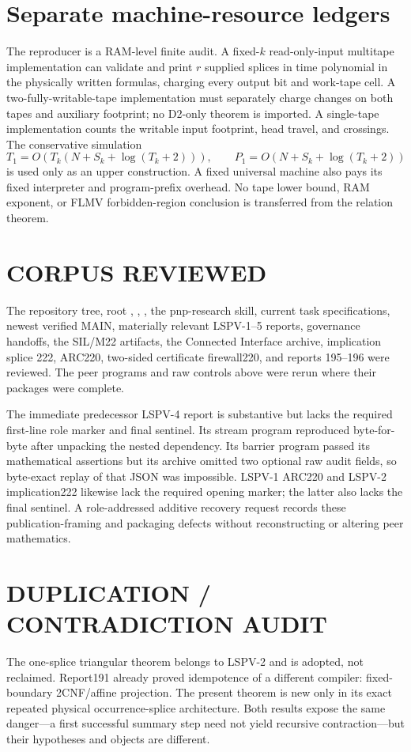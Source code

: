 \documentclass[11pt]{article}
\begin{document}
\section{Separate machine-resource ledgers}
The reproducer is a RAM-level finite audit. A fixed-$k$ read-only-input
multitape implementation can validate and print $r$ supplied splices in time
polynomial in the physically written formulas, charging every output bit and
work-tape cell. A two-fully-writable-tape implementation must separately
charge changes on both tapes and auxiliary footprint; no D2-only theorem is
imported. A single-tape implementation counts the writable input footprint,
head travel, and crossings. The conservative simulation
\[
T_1=O\!\left(T_k(N+S_k+\log(T_k+2))\right),\qquad
P_1=O\!\left(N+S_k+\log(T_k+2)\right)
\]
is used only as an upper construction. A fixed universal machine also pays
its fixed interpreter and program-prefix overhead. No tape lower bound, RAM
exponent, or FLMV forbidden-region conclusion is transferred from the
relation theorem.

\section{CORPUS REVIEWED}
The repository tree, root , ,
, the pnp-research skill, current task specifications, newest
verified MAIN, materially relevant LSPV-1--5 reports, governance handoffs,
the SIL/M22 artifacts, the Connected Interface archive, implication splice
222, ARC220, two-sided certificate firewall220, and reports 195--196 were
reviewed. The peer programs and raw controls above were rerun where their
packages were complete.

The immediate predecessor LSPV-4 report is substantive but lacks the required
first-line role marker and final sentinel. Its stream program reproduced
byte-for-byte after unpacking the nested dependency. Its barrier program
passed its mathematical assertions but its archive omitted two optional raw
audit fields, so byte-exact replay of that JSON was impossible. LSPV-1 ARC220
and LSPV-2 implication222 likewise lack the required opening marker; the
latter also lacks the final sentinel. A role-addressed additive recovery
request records these publication-framing and packaging defects without
reconstructing or altering peer mathematics.

\section{DUPLICATION / CONTRADICTION AUDIT}
The one-splice triangular theorem belongs to LSPV-2 and is adopted, not
reclaimed. Report191 already proved idempotence of a different compiler:
fixed-boundary 2CNF/affine projection. The present theorem is new only in its
exact repeated physical occurrence-splice architecture. Both results expose
the same danger---a first successful summary step need not yield recursive
contraction---but their hypotheses and objects are different.
\end{document}
